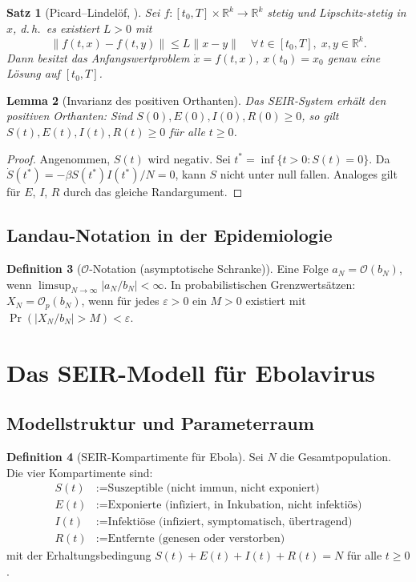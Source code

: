 ﻿\documentclass[12pt,a4paper]{article}
\theoremstyle{definition}
\newtheorem{definition}{Definition}[section]
\theoremstyle{plain}
\newtheorem{satz}[definition]{Satz}
\newtheorem{lemma}[definition]{Lemma}
\theoremstyle{remark}
\newcommand{\RRR}{\mathbb{R}}
\begin{document}
\begin{satz}[Picard--Lindelöf, \cite{coddington1955}]
\label{satz:picard}
Sei $f : [t_0, T] \times \RRR^k \to \RRR^k$ stetig und Lipschitz-stetig in $x$,
d.\,h.\ es existiert $L > 0$ mit
\[
  \|f(t, x) - f(t, y)\| \leq L \|x - y\| \quad \forall\, t \in [t_0, T],\; x,y \in \RRR^k.
\]
Dann besitzt das Anfangswertproblem $\dot{x} = f(t,x)$, $x(t_0) = x_0$
genau eine Lösung auf $[t_0, T]$.
\end{satz}

\begin{lemma}[Invarianz des positiven Orthanten]
\label{lemma:positiv}
Das SEIR-System erhält den positiven Orthanten: Sind $S(0), E(0), I(0), R(0) \geq 0$,
so gilt $S(t), E(t), I(t), R(t) \geq 0$ für alle $t \geq 0$.
\end{lemma}

\begin{proof}
Angenommen, $S(t)$ wird negativ. Sei $t^* = \inf\{t > 0 : S(t) = 0\}$.
Da $\dot{S}(t^*) = -\beta S(t^*) I(t^*)/N = 0$, kann $S$ nicht unter null fallen.
Analoges gilt für $E$, $I$, $R$ durch das gleiche Randargument.
\end{proof}

\subsection{Landau-Notation in der Epidemiologie}

\begin{definition}[$\mathcal{O}$-Notation (asymptotische Schranke)]
Eine Folge $a_N = \mathcal{O}(b_N)$, wenn $\limsup_{N\to\infty} |a_N/b_N| < \infty$.
In probabilistischen Grenzwertsätzen: $X_N = \mathcal{O}_p(b_N)$, wenn für jedes
$\varepsilon > 0$ ein $M > 0$ existiert mit $\Pr(|X_N/b_N| > M) < \varepsilon$.
\end{definition}

\section{Das SEIR-Modell für Ebolavirus}

\subsection{Modellstruktur und Parameterraum}

\begin{definition}[SEIR-Kompartimente für Ebola]
Sei $N$ die Gesamtpopulation. Die vier Kompartimente sind:
\begin{align*}
  S(t) &:= \text{Suszeptible (nicht immun, nicht exponiert)} \\
  E(t) &:= \text{Exponierte (infiziert, in Inkubation, nicht infektiös)} \\
  I(t) &:= \text{Infektiöse (infiziert, symptomatisch, übertragend)} \\
  R(t) &:= \text{Entfernte (genesen oder verstorben)}
\end{align*}
mit der Erhaltungsbedingung $S(t) + E(t) + I(t) + R(t) = N$ für alle $t \geq 0$.
\end{definition}
\end{document}
